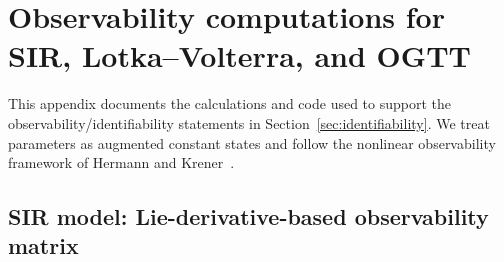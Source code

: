 \section{Observability computations for SIR, Lotka--Volterra, and OGTT}
\label{app:observability}

This appendix documents the calculations and code used to support the observability/identifiability statements in
Section~\ref{sec:identifiability}.
We treat parameters as augmented constant states and follow the nonlinear observability framework of Hermann and Krener~\cite{hermann1977nonlinear}.

\subsection{SIR model: Lie-derivative-based observability matrix}
\label{app:obs-sir}

